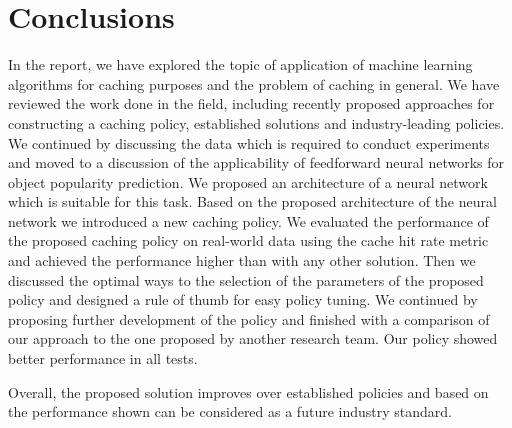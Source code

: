 \section{Conclusions}

In the report, we have explored the topic of application of machine learning algorithms for caching purposes and the problem of caching in general. We have reviewed the work done in the field, including recently proposed approaches for constructing a caching policy, established solutions and industry-leading policies. We continued by discussing the data which is required to conduct experiments and moved to a discussion of the applicability of feedforward neural networks for object popularity prediction. We proposed an architecture of a neural network which is suitable for this task. Based on the proposed architecture of the neural network we introduced a new caching policy. We evaluated the performance of the proposed caching policy on real-world data using the cache hit rate metric and achieved the performance higher than with any other solution.  Then we discussed the optimal ways to the selection of the parameters of the proposed policy and designed a rule of thumb for easy policy tuning. We continued by proposing further development of the policy and finished with a comparison of our approach to the one proposed by another research team.  Our policy showed better performance in all tests.

Overall, the proposed solution improves over established policies and based on the performance shown can be considered as a future industry standard.